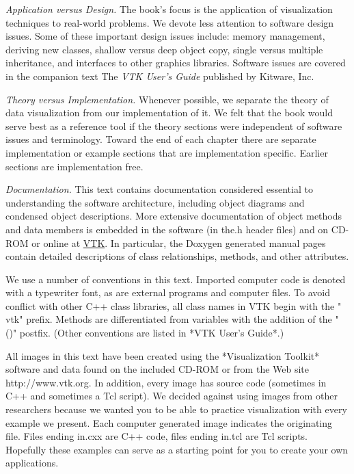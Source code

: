 \emph{Application versus Design.} The book's focus is the application of visualization techniques to real-world problems. We devote less attention to software design issues. Some of these important design issues include: memory management, deriving new classes, shallow versus deep object copy, single versus multiple inheritance, and interfaces to other graphics libraries. Software issues are covered in the companion text The \emph{VTK User's Guide} published by Kitware, Inc.

\textit{Theory versus Implementation.} Whenever possible, we separate the theory of data visualization from our implementation of it. We felt that the book would serve best as a reference tool if the theory sections were independent of software issues and terminology. Toward the end of each chapter there are separate implementation or example sections that are implementation specific. Earlier sections are implementation free.

\emph{Documentation.} This text contains documentation considered essential to understanding the software architecture, including object diagrams and condensed object descriptions. More extensive documentation of object methods and data members is embedded in the software (in the.h header files) and on CD-ROM or online at \href{https://www.vtk.org/}{VTK}. In particular, the Doxygen generated manual pages contain detailed descriptions of class relationships, methods, and other attributes.

We use a number of conventions in this text. Imported computer code is denoted with a typewriter font, as are external programs and computer files. To avoid conflict with other C++ class libraries, all class names in VTK begin with the " vtk" prefix. Methods are differentiated from variables with the addition of the " ()" postfix. (Other conventions are listed in *VTK User's Guide*.)

All images in this text have been created using the *Visualization Toolkit* software and data found on the included CD-ROM or from the Web site http://www.vtk.org. In addition, every image has source code (sometimes in C++ and sometimes a Tcl script). We decided against using images from other researchers because we wanted you to be able to practice visualization with every example we present. Each computer generated image indicates the originating file. Files ending in.cxx are C++ code, files ending in.tcl are Tcl scripts. Hopefully these examples can serve as a starting point for you to create your own applications.


